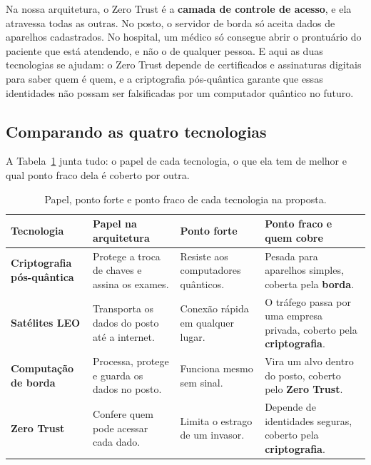 \documentclass[12pt,a4paper]{article}
\newcommand{\fonte}[1]{\par\vspace{3pt}{\centering\footnotesize Fonte: #1\par}}
\begin{document}
Na nossa arquitetura, o Zero Trust é a \textbf{camada de controle de acesso}, e ela atravessa todas as outras. No posto, o servidor de borda só aceita dados de aparelhos cadastrados. No hospital, um médico só consegue abrir o prontuário do paciente que está atendendo, e não o de qualquer pessoa. E aqui as duas tecnologias se ajudam: o Zero Trust depende de certificados e assinaturas digitais para saber quem é quem, e a criptografia pós-quântica garante que essas identidades não possam ser falsificadas por um computador quântico no futuro.

\subsection{Comparando as quatro tecnologias}

A Tabela~\ref{tab:papeis} junta tudo: o papel de cada tecnologia, o que ela tem de melhor e qual ponto fraco dela é coberto por outra.

\begin{table}[H]
\centering
\caption{Papel, ponto forte e ponto fraco de cada tecnologia na proposta.}
\label{tab:papeis}
\small
\renewcommand{\arraystretch}{1.35}
\begin{tabularx}{\textwidth}{>{\raggedright\arraybackslash}p{2.6cm} >{\raggedright\arraybackslash}X >{\raggedright\arraybackslash}X >{\raggedright\arraybackslash}X}
\toprule
\textbf{Tecnologia} & \textbf{Papel na arquitetura} & \textbf{Ponto forte} & \textbf{Ponto fraco e quem cobre} \\
\midrule
\rowcolor{azul!8}\textcolor{azul}{\textbf{Criptografia pós-quântica}} & Protege a troca de chaves e assina os exames. & Resiste aos computadores quânticos. & Pesada para aparelhos simples, coberta pela \textbf{borda}. \\
\rowcolor{laranja!10}\textcolor{laranja}{\textbf{Satélites LEO}} & Transporta os dados do posto até a internet. & Conexão rápida em qualquer lugar. & O tráfego passa por uma empresa privada, coberto pela \textbf{criptografia}. \\
\rowcolor{verdeborda!10}\textcolor{verdeborda}{\textbf{Computação de borda}} & Processa, protege e guarda os dados no posto. & Funciona mesmo sem sinal. & Vira um alvo dentro do posto, coberto pelo \textbf{Zero Trust}. \\
\rowcolor{roxo!10}\textcolor{roxo}{\textbf{Zero Trust}} & Confere quem pode acessar cada dado. & Limita o estrago de um invasor. & Depende de identidades seguras, coberto pela \textbf{criptografia}. \\
\bottomrule
\end{tabularx}
\fonte{elaborada pelo autor (2026).}
\end{table}
\end{document}
